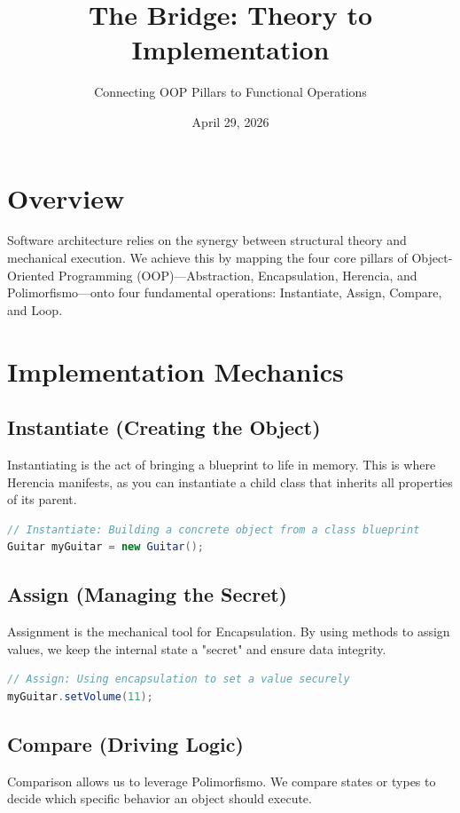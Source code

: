 \documentclass[11pt]{article}
\title{The Bridge: Theory to Implementation}
\author{Connecting OOP Pillars to Functional Operations}
\date{April 29, 2026}
\begin{document}
\maketitle

\section{Overview}
Software architecture relies on the synergy between structural theory and mechanical execution. We achieve this by mapping the four core pillars of Object-Oriented Programming (OOP)—Abstraction, Encapsulation, Herencia, and Polimorfismo—onto four fundamental operations: Instantiate, Assign, Compare, and Loop.

\section{Implementation Mechanics}

\subsection{Instantiate (Creating the Object)}
Instantiating is the act of bringing a blueprint to life in memory. This is where Herencia manifests, as you can instantiate a child class that inherits all properties of its parent.

\begin{lstlisting}[language=Java]
// Instantiate: Building a concrete object from a class blueprint
Guitar myGuitar = new Guitar();
\end{lstlisting}

\subsection{Assign (Managing the Secret)}
Assignment is the mechanical tool for Encapsulation. By using methods to assign values, we keep the internal state a "secret" and ensure data integrity.

\begin{lstlisting}[language=Java]
// Assign: Using encapsulation to set a value securely
myGuitar.setVolume(11);
\end{lstlisting}

\subsection{Compare (Driving Logic)}
Comparison allows us to leverage Polimorfismo. We compare states or types to decide which specific behavior an object should execute.
\end{document}
